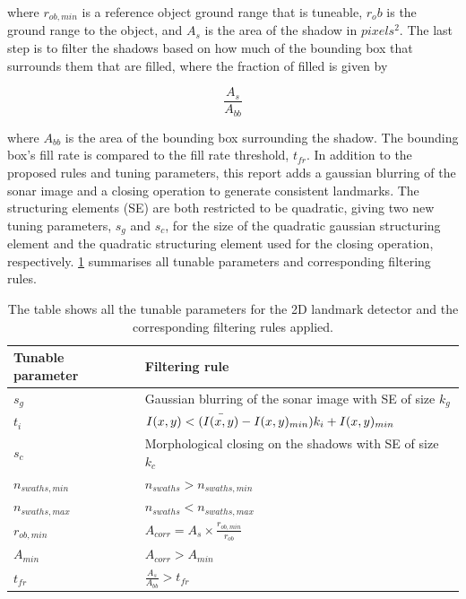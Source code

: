 where $r_{ob, min}$ is a reference object ground range that is tuneable, $r_ob$ is the ground range to the object, and $A_s$ is the area of the shadow in $pixels^2$. The last step is to filter the shadows based on how much of the bounding box that surrounds them that are filled, where the fraction of filled is given by

\begin{equation}
    \frac{A_s}{A_{bb}}
    \label{eq:fill_rate_bb}
\end{equation}

where $A_{bb}$ is the area of the bounding box surrounding the shadow. The bounding box's fill rate is compared to the fill rate threshold, $t_{fr}$. In addition to the proposed rules and tuning parameters, this report adds a gaussian blurring of the sonar image and a closing operation to generate consistent landmarks. The structuring elements (SE) are both restricted to be quadratic, giving two new tuning parameters, $s_g$ and $s_c$, for the size of the quadratic gaussian structuring element and the quadratic structuring element used for the closing operation, respectively. \cref{tab:2D_tuning_rules} summarises all tunable parameters and corresponding filtering rules. 

\begin{table}
    \begin{center}
    \caption{The table shows all the tunable parameters for the 2D landmark detector and the corresponding filtering rules applied.}
    \begin{tabular}{ll}
        \hline
        \textbf{Tunable parameter} & \textbf{Filtering rule}                            \\ \hline
        $s_g$             & Gaussian blurring of the sonar image with SE of size $k_g$  \\ 
        $t_i$             & $I(x,y) < (\Bar{I(x,y)} - I(x,y)_{min}) k_i + I(x,y)_{min}$ \\ 
        $s_c$             & Morphological closing on the shadows with SE of size $k_c$  \\ 
        $n_{swaths,min}$  & $n_{swaths} > n_{swaths,min}$                               \\ 
        $n_{swaths,max}$  & $n_{swaths} < n_{swaths,max}$                               \\ 
        $r_{ob,min}$      & $A_{corr} = A_s \times \frac{r_{ob,min}}{r_{ob}}$           \\ 
        $A_{min}$         & $A_{corr} > A_{min}$                                        \\ 
        $t_{fr}$          & $\frac{A_s}{A_{bb}} > t_{fr}$                               \\ 
        \hline
    \end{tabular}
    \end{center}
    \label{tab:2D_tuning_rules}
\end{table}

